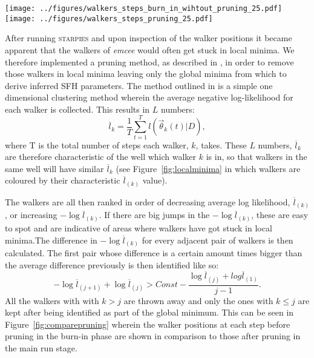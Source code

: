 \documentclass[useAMS,usenatbib]{mn2e}
\begin{document}
\begin{figure*}
\centering
\texttt{[image: ../figures/walkers\_steps\_burn\_in\_wihtout\_pruning\_25.pdf]}
\texttt{[image: ../figures/walkers\_steps\_pruning\_25.pdf]}
\caption{The positions traced by the \emph{emcee} walkers with step number (i.e. time) in each of the $[Z, t_q, \tau]$ dimensions during the burn in phase before pruning (left) and the post burn-in phase after pruning (right). The red lines show the known true values in each panel. Walkers have got stuck in local minima (see Figure±\ref{fig:localminima}) but some have managed to find the global minimum which can be seen more clearly in the right hand panels.}
\label{fig:comparepruning}
\end{figure*}

After running \textsc{starpies} and upon inspection of the walker positions it became apparent that the walkers of \emph{emcee} would often get stuck in local minima. We therefore implemented a pruning method, as described in \cite{hou12}, in order to remove those walkers in local minima leaving only the global minima from which to derive inferred SFH parameters. The method outlined in \cite{hou12} is a simple one dimensional clustering method wherein the average negative log-likelihood for each walker is collected. This results in $L$ numbers:
\begin{equation}
\overline{l}_k = \frac{1}{T} \sum^{T}_{t=1} l(\vec{\theta}_k(t)|D),
\end{equation}
where T is the total number of steps each walker, $k$, takes. These $L$ numbers, $\overline{l}_k$ are therefore characteristic of the well which walker $k$ is in, so that walkers in the same well will have similar $\overline{l}_k$ (see Figure~\ref{fig:localminima} in which walkers are coloured by their characteristic $\overline{l}_{(k)}$ value). 


The walkers are all then ranked in order of decreasing average log likelihood, $\overline{l}_{(k)}$, or increasing $- \log \overline{l}_{(k)}$. If there are big jumps in the $- \log \overline{l}_{(k)}$, these are easy to spot and are indicative of areas where walkers have got stuck in local minima.The difference in $- \log \overline{l}_{(k)}$ for every adjacent pair of walkers is then calculated. The first pair whose difference is a certain amount times bigger than the average difference previously is then identified like so:
\begin{equation}
-\log \overline{l}_{(j+1)} + \log \overline{l}_{(j)} > Const − \frac{\log \overline{l}_{(j)} + log \overline{l}_{(1)}}{j - 1}.
\end{equation}
All the walkers with with $k>j$ are thrown away and only the ones with $k \leq j$ are kept after being identified as part of the global minimum. This can be seen in Figure~\ref{fig:comparepruning} wherein the walker positions at each step before pruning in the burn-in phase are shown in comparison to those after pruning in the main run stage.
\end{document}
